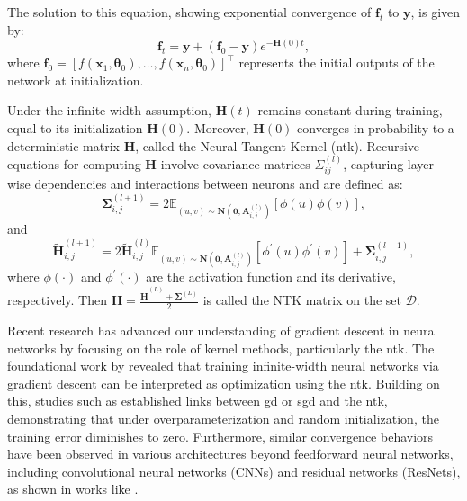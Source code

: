 The solution to this equation, showing exponential convergence of \( \mathbf{f}_t \) to \( \mathbf{y} \), is given by:
\[
\mathbf{f}_t = \mathbf{y} + (\mathbf{f}_0 - \mathbf{y})e^{-\mathbf{H}(0)t},
\]
where \( \mathbf{f}_0 = [f(\mathbf{x}_1, \boldsymbol{\theta}_0), \ldots, f(\mathbf{x}_n, \boldsymbol{\theta}_0)]^\top \) represents the initial outputs of the network at initialization.

Under the infinite-width assumption, \( \mathbf{H}(t) \) remains constant during training, equal to its initialization \( \mathbf{H}(0) \). Moreover, \( \mathbf{H}(0) \) converges in probability to a deterministic matrix \( \mathbf{H} \), called the Neural Tangent Kernel (\ac{ntk}). Recursive equations for computing \( \mathbf{H} \) involve covariance matrices \( \Sigma^{(l)}_{ij} \), capturing layer-wise dependencies and interactions between neurons and are defined as:
\[
\boldsymbol{\Sigma}_{i,j}^{(l+1)} = 2 \mathbb{E}_{(u,v) \sim \mathbf{N}(\mathbf{0}, \mathbf{A}_{i,j}^{(l)})} [\phi(u) \phi(v)],
\]
and
\[
\widetilde{\mathbf{H}}_{i,j}^{(l+1)} = 2\widetilde{\mathbf{H}}_{i,j}^{(l)}\mathbb{E}_{(u,v) \sim \mathbf{N}(\mathbf{0}, \mathbf{A}_{i,j}^{(l)})} [\phi^\prime(u) \phi^\prime(v)] + \boldsymbol{\Sigma}_{i,j}^{(l+1)},
\]
where \( \phi(\cdot) \) and \( \phi^\prime(\cdot) \) are the activation function and its derivative, respectively. Then $\mathbf{H} = \frac{\mathbf{\widetilde{H}}^{(L)}+ \boldsymbol{\Sigma} ^ {(L)}}{2}$ is called the NTK matrix on the set $\mathcal{D}$.


Recent research has advanced our understanding of gradient descent in neural networks by focusing on the role of kernel methods, particularly the \ac{ntk}. The foundational work by \citet{jacot2018neural} revealed that training infinite-width neural networks via gradient descent can be interpreted as optimization using the \ac{ntk}. Building on this, studies such as \citet{du2018gradient, allen2019convergence, su2019learning, arora2019fine, du2019gradient, zou2020gradient} established links between \acf{gd} or \acf{sgd} and the \ac{ntk}, demonstrating that under overparameterization and random initialization, the training error diminishes to zero. Furthermore, similar convergence behaviors have been observed in various architectures beyond feedforward neural networks, including convolutional neural networks (CNNs) and residual networks (ResNets), as shown in works like \citet{arora2019exact, allen2019can, du2019gradient, zou2020gradient, tirer2022kernel}.

